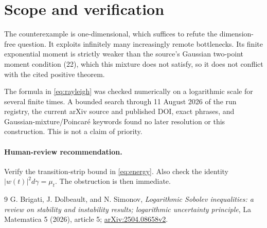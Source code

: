 \documentclass[10pt]{article}
\begin{document}
\section{Scope and verification}
The counterexample is one-dimensional, which suffices to refute the
dimension-free question.  It exploits infinitely many increasingly remote
bottlenecks.  Its finite exponential moment is strictly weaker than the
source's Gaussian two-point moment condition (22), which this mixture does
not satisfy, so it does not conflict with the cited positive theorem.

The formula in \eqref{eq:rayleigh} was checked numerically on a logarithmic
scale for several finite times.  A bounded search through 11 August 2026 of
the run registry, the current arXiv source and published DOI, exact phrases,
and Gaussian-mixture/Poincar\'e keywords found no later resolution or this
construction.  This is not a claim of priority.

\paragraph{Human-review recommendation.}
Verify the transition-strip bound in \eqref{eq:energy}.  Also check the
identity $|w(t)|^2d\gamma=\mu_t$.  The obstruction is then immediate.

\begin{thebibliography}{9}
G. Brigati, J. Dolbeault, and N. Simonov,
\emph{Logarithmic Sobolev inequalities: a review on stability and instability
results; logarithmic uncertainty principle}, La Matematica 5 (2026), article
5; \href{https://arxiv.org/abs/2504.08658}{arXiv:2504.08658v2}.
\end{thebibliography}
\end{document}
